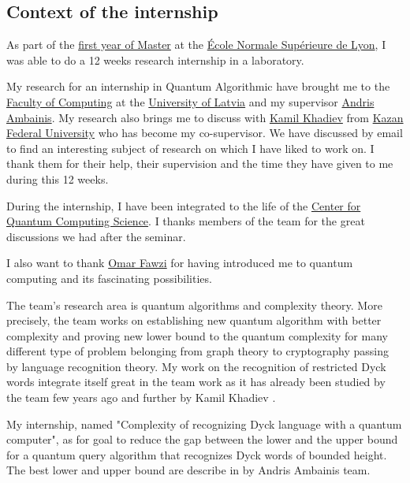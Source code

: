 \subsection*{Context of the internship}

As part of the \href{http://informatique.ens-lyon.fr/en/academic-programs/master/m1}{first year of Master} at the
\href{http://www.ens-lyon.fr/en/}{École Normale Supérieure de Lyon},
I was able to do a 12 weeks research internship in a laboratory.

My research for an internship in Quantum Algorithmic have brought me to
the \href{https://www.lu.lv/en/studies/faculties/faculty-of-computing/}{Faculty of Computing}
at the \href{https://www.lu.lv/}{University of Latvia}
and my supervisor \href{http://home.lu.lv/~ambainis/}{Andris Ambainis}. My research also
brings me to discuss with \href{https://kpfu.ru/Kamil.Hadiev?p_lang=2}{Kamil Khadiev}
from \href{https://eng.kpfu.ru/}{Kazan Federal University} who has become my co-supervisor.
We have discussed by email to find an interesting subject of research on which I have
liked to work on. I thank them for their help, their supervision and the time they have
given to me during this 12 weeks.

During the internship, I have been integrated to the life of the
\href{https://quantum.lu.lv/}{Center for Quantum Computing Science}.
I thanks members of the team for the great discussions we had after
the seminar.

I also want to thank \href{https://perso.ens-lyon.fr/omar.fawzi/}{Omar Fawzi} for
having introduced me to quantum computing and its fascinating possibilities.

The team's research area is quantum algorithms and complexity theory. More precisely,
the team works on establishing new quantum algorithm with better complexity and proving
new lower bound to the quantum complexity for many different type of problem belonging
from graph theory to cryptography passing by language  recognition theory. My work on
the recognition of restricted Dyck words integrate itself great in the team work as it
has already been studied by the team few years ago \cite{art:2DGrid} and further by
Kamil Khadiev \cite{DBLP:conf/uc/KhadievK21}.

My internship, named "Complexity of recognizing Dyck language with a
quantum computer", as for goal to reduce the gap between the lower and the upper bound for
a quantum query algorithm that recognizes Dyck words of bounded height. The best
lower and upper bound are describe in \cite{art:2DGrid} by Andris Ambainis team.


